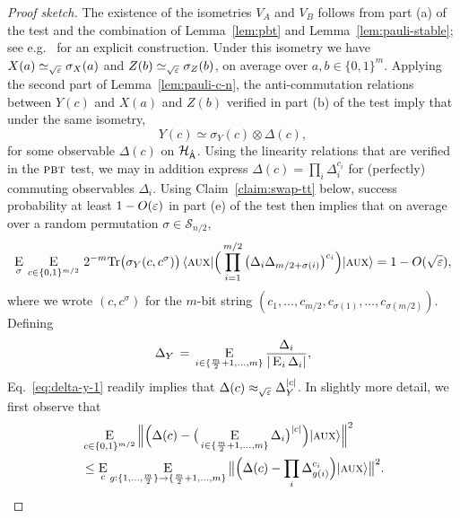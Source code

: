 \begin{proof}[Proof sketch]
The existence of the isometries $V_A$ and $V_B$ follows from part (a) of the test and the combination of Lemma~\ref{lem:pbt} and Lemma~\ref{lem:pauli-stable}; see e.g.~\cite{natarajan2016robust} for an explicit construction. 
 Under this isometry we have $X(a) \simeq_{\sqrt{\varepsilon}} \sigma_X(a)$ and $Z(b)\simeq_{\sqrt{\varepsilon}} \sigma_Z(b)$, on average over $a,b\in\{0,1\}^m$. Applying the second part of Lemma~\ref{lem:pauli-c-n},  the  anti-commutation relations between $Y(c)$ and $X(a)$ and $Z(b)$ verified in part (b) of the test imply that under the same isometry,
$$ Y(c) \simeq \sigma_Y(c) \otimes {\Delta}(c),$$
for some observable ${\Delta}(c)$ on ${\mathcal{H}}_{\hat{{\textsf{A}}}}$. Using the linearity relations that are verified in the $\textsc{pbt}$ test, we may in addition express $\Delta(c) = \prod_i \Delta_{i}^{c_i}$ for (perfectly) commuting observables $\Delta_i$. Using Claim~\ref{claim:swap-tt} below, success probability at least $1-O(\varepsilon)$ in part (e) of the test then implies that on average over a random permutation $\sigma \in \mathcal{S}_{n/2}$, 
\begin{equation}\label{eq:delta-y-1}
 \mathop{\textsc{E}}_{\sigma} \,\mathop{\textsc{E}}_{c\in\{0,1\}^{m/2}}\,2^{-m}\mbox{\rm Tr} \big(\sigma_Y(c,c^\sigma)\big)\,\langle\textsc {aux}| \Big( \prod_{i=1}^{m/2}\big( \Delta_i \Delta_{m/2+ \sigma(i)} \big)^{c_i} \Big) |\textsc {aux}\rangle  = 1- O(\sqrt{\varepsilon}),
\end{equation}
where we wrote $(c,c^\sigma)$ for the $m$-bit string $(c_1,\ldots,c_{m/2},c_{\sigma(1)},\ldots,c_{\sigma(m/2)})$. Defining
 \begin{equation}\label{eq:delta-y-3}
\Delta_Y \,=\, \mathop{\textsc{E}}_{i\in\{\frac{m}{2}+1,\ldots,m\}} \frac{\Delta_i}{|\mathop{\textsc{E}}_{i} \Delta_i|},
\end{equation}
Eq.~\eqref{eq:delta-y-1} readily implies that $\Delta(c) \approx_{\sqrt{\varepsilon}} \Delta_Y^{|c|}$. In slightly more detail, we first observe that
\begin{align}
  &\Es{c\in\{0,1\}^{m/2}} \Big\| \Big(\Delta(c) -
  \big(\Es{i\in\{\frac{m}{2}+1,\ldots,m\}} \Delta_{i}\big)^{|c|}\Big) \ket{\aux}
  \Big\|^2\\&\leq 
\Es{c} \Es{g:\{1,\ldots,\frac{m}{2}\}\to\{\frac{m}{2}+1,\ldots,m\}} \big\|\Big( \Delta(c) - \prod_i \Delta_{g(i)}^{c_i}\Big) \ket{\aux} \big\|^2.\label{eq:delta-y-2}

\end{align}
\end{proof}
